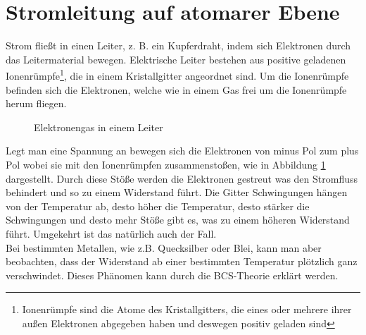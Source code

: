 \section{Stromleitung auf atomarer Ebene}
Strom fließt in einen Leiter, z. B. ein Kupferdraht, indem sich Elektronen durch das Leitermaterial
bewegen. Elektrische Leiter bestehen aus positive geladenen Ionenrümpfe\footnote{Ionenrümpfe sind die Atome des Kristallgitters, die eines oder mehrere ihrer außen Elektronen abgegeben haben und deswegen positiv geladen sind}, die in einem Kristallgitter angeordnet sind. Um 
die Ionenrümpfe befinden sich die Elektronen, welche wie in einem Gas frei um die Ionenrümpfe herum fliegen.


\begin{figure}[h]
    
    \centering
    \caption{Elektronengas in einem Leiter\label{fig:Elektronengas}}
\end{figure}
Legt man eine Spannung an bewegen sich die Elektronen von minus Pol zum plus Pol 
wobei sie mit den Ionenrümpfen zusammenstoßen, wie in Abbildung \ref{fig:Elektronengas} dargestellt.
Durch diese Stöße werden die Elektronen gestreut was den Stromfluss behindert und so zu einem Widerstand führt. Die Gitter Schwingungen 
hängen von der Temperatur ab, desto höher die Temperatur, desto stärker die Schwingungen und desto mehr Stöße gibt es, was zu einem höheren
Widerstand führt. Umgekehrt ist das natürlich 
auch der Fall. \\

Bei bestimmten Metallen, wie z.B. Quecksilber oder Blei, kann man aber beobachten, dass der Widerstand ab einer bestimmten 
Temperatur plötzlich ganz verschwindet. Dieses Phänomen kann durch die BCS-Theorie erklärt werden.